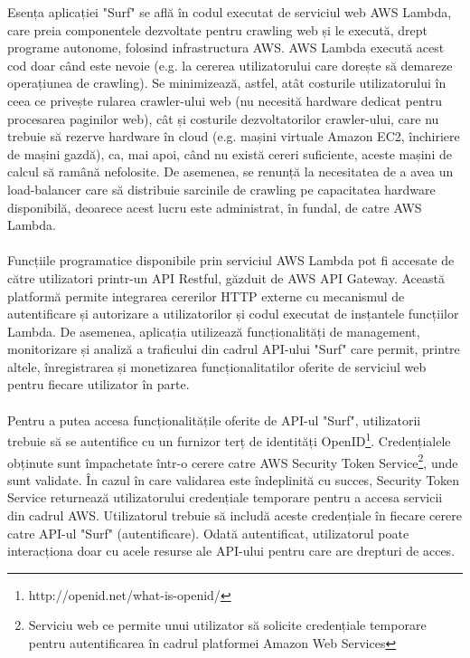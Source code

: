 \newcommand{\AWSSTS}{Serviciu web ce permite unui utilizator să solicite credențiale temporare pentru autentificarea în cadrul platformei Amazon Web Services}
\newcommand{\openIDDefinition}{http://openid.net/what-is-openid/}


Esența aplicației "Surf" se află în codul executat de serviciul web AWS Lambda, care preia componentele dezvoltate pentru crawling web și le execută, drept programe autonome, folosind infrastructura AWS. AWS Lambda execută acest cod doar când este nevoie (e.g. la cererea utilizatorului care dorește să demareze operațiunea de crawling). Se minimizează, astfel, atât costurile utilizatorului în ceea ce privește rularea crawler-ului web (nu necesită hardware dedicat pentru procesarea paginilor web), cât și costurile dezvoltatorilor crawler-ului, care nu trebuie să rezerve hardware în cloud (e.g. mașini virtuale Amazon EC2, închiriere de mașini gazdă), ca, mai apoi, când nu există cereri suficiente, aceste mașini de calcul să ramână nefolosite. De asemenea, se renunță la necesitatea de a avea un load-balancer care să distribuie sarcinile de crawling pe capacitatea hardware disponibilă, deoarece acest lucru este administrat, în fundal, de catre AWS Lambda.
\\
\\
Funcțiile programatice disponibile prin serviciul AWS Lambda pot fi accesate de către utilizatori printr-un API Restful, găzduit de AWS API Gateway. Această platformă permite integrarea cererilor HTTP externe cu mecanismul de autentificare și autorizare a utilizatorilor și codul executat de insțantele funcțiilor Lambda. De asemenea, aplicația utilizează funcționalități de management, monitorizare și analiză a traficului din cadrul API-ului "Surf" care permit, printre altele, înregistrarea și monetizarea funcționalitatilor oferite de serviciul web pentru fiecare utilizator în parte. 
\\
\\
Pentru a putea accesa funcționalitățile oferite de API-ul "Surf", utilizatorii trebuie să se autentifice cu un furnizor terț de identități OpenID\footnote{\openIDDefinition}. Credențialele obținute sunt împachetate într-o cerere catre AWS Security Token Service\footnote{\AWSSTS}, unde sunt validate. În cazul în care validarea este îndeplinită cu succes, Security Token Service returnează utilizatorului credențiale temporare pentru a accesa servicii din cadrul AWS. Utilizatorul trebuie să includă aceste credențiale în fiecare cerere catre API-ul "Surf" (autentificare). Odată autentificat, utilizatorul poate interacționa doar cu acele resurse ale API-ului pentru care are drepturi de acces. 

